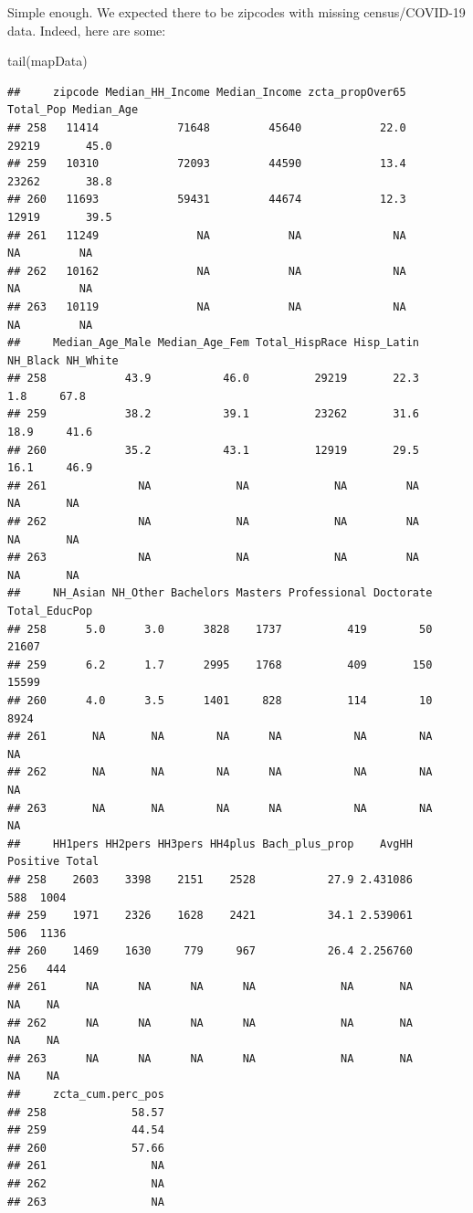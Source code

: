 \documentclass[
  openany]{book}
\newenvironment{Shaded}{\begin{snugshade}}{\end{snugshade}}
\newcommand{\FunctionTok}[1]{\textcolor[rgb]{0.00,0.00,0.00}{#1}}
\newcommand{\NormalTok}[1]{#1}
\begin{document}
Simple enough. We expected there to be zipcodes with missing census/COVID-19 data. Indeed, here are some:

\begin{Shaded}
\begin{Highlighting}[]
\FunctionTok{tail}\NormalTok{(mapData)}
\end{Highlighting}
\end{Shaded}

\begin{verbatim}
##     zipcode Median_HH_Income Median_Income zcta_propOver65 Total_Pop Median_Age
## 258   11414            71648         45640            22.0     29219       45.0
## 259   10310            72093         44590            13.4     23262       38.8
## 260   11693            59431         44674            12.3     12919       39.5
## 261   11249               NA            NA              NA        NA         NA
## 262   10162               NA            NA              NA        NA         NA
## 263   10119               NA            NA              NA        NA         NA
##     Median_Age_Male Median_Age_Fem Total_HispRace Hisp_Latin NH_Black NH_White
## 258            43.9           46.0          29219       22.3      1.8     67.8
## 259            38.2           39.1          23262       31.6     18.9     41.6
## 260            35.2           43.1          12919       29.5     16.1     46.9
## 261              NA             NA             NA         NA       NA       NA
## 262              NA             NA             NA         NA       NA       NA
## 263              NA             NA             NA         NA       NA       NA
##     NH_Asian NH_Other Bachelors Masters Professional Doctorate Total_EducPop
## 258      5.0      3.0      3828    1737          419        50         21607
## 259      6.2      1.7      2995    1768          409       150         15599
## 260      4.0      3.5      1401     828          114        10          8924
## 261       NA       NA        NA      NA           NA        NA            NA
## 262       NA       NA        NA      NA           NA        NA            NA
## 263       NA       NA        NA      NA           NA        NA            NA
##     HH1pers HH2pers HH3pers HH4plus Bach_plus_prop    AvgHH Positive Total
## 258    2603    3398    2151    2528           27.9 2.431086      588  1004
## 259    1971    2326    1628    2421           34.1 2.539061      506  1136
## 260    1469    1630     779     967           26.4 2.256760      256   444
## 261      NA      NA      NA      NA             NA       NA       NA    NA
## 262      NA      NA      NA      NA             NA       NA       NA    NA
## 263      NA      NA      NA      NA             NA       NA       NA    NA
##     zcta_cum.perc_pos
## 258             58.57
## 259             44.54
## 260             57.66
## 261                NA
## 262                NA
## 263                NA
\end{verbatim}
\end{document}
